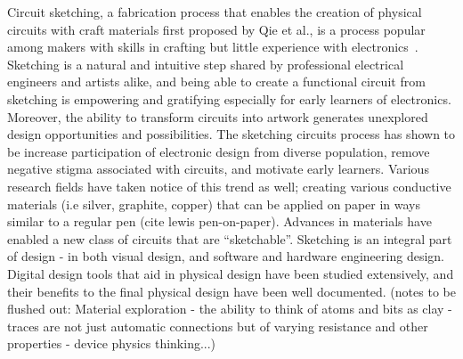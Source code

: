 \documentclass{sigchi}
\begin{document}
Circuit sketching, a fabrication process that enables the creation of physical circuits with craft materials first proposed by Qie et al., is a process popular among makers with skills in crafting but little experience with electronics~\cite{qi_sketching_2014, qi_stickers_2015}.
Sketching is a natural and intuitive step shared by professional electrical engineers and artists alike, and being able to create a functional circuit from sketching is empowering and gratifying especially for early learners of electronics. Moreover, the ability to transform circuits into artwork generates unexplored design opportunities and possibilities.  
The sketching circuits process has shown to be increase participation of electronic design from diverse population, remove negative stigma associated with circuits, and motivate early learners. Various research fields have taken notice of this trend as well; creating various conductive materials (i.e silver, graphite, copper) that can be applied on paper in ways similar to a regular pen (cite lewis pen-on-paper). Advances in materials have enabled a new class of circuits that are ``sketchable''. 
Sketching is an integral part of design - in both visual design, and software and hardware engineering design. Digital design tools that aid in physical design have been studied extensively, and their benefits to the final physical design have been well documented. (notes to be flushed out: Material exploration - the ability to think of atoms and bits as clay - traces are not just automatic connections but of varying resistance and other properties - device physics thinking...)
\end{document}
